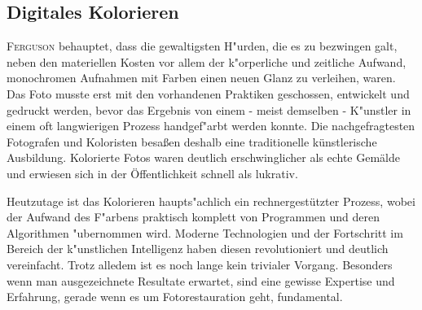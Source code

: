 \documentclass[12pt,titlepage]{article}
\begin{document}


\subsection{Digitales Kolorieren}

\textsc{Ferguson \cite{ferguson2008living}} behauptet, dass die gewaltigsten H"urden, die es zu bezwingen galt, neben den materiellen Kosten vor allem der k"orperliche und zeitliche Aufwand, monochromen Aufnahmen mit Farben einen neuen Glanz zu verleihen, waren. Das Foto musste erst mit den vorhandenen Praktiken geschossen, entwickelt und gedruckt werden, bevor das Ergebnis von einem - meist demselben - K"unstler in einem oft langwierigen Prozess handgef"arbt werden konnte. Die nachgefragtesten Fotografen und Koloristen besaßen deshalb eine traditionelle künstlerische Ausbildung. Kolorierte Fotos waren deutlich erschwinglicher als echte Gemälde und erwiesen sich in der Öffentlichkeit schnell als lukrativ. \textsc{\cite{ferguson2008living, hoppe2010spectroscopic}}

Heutzutage ist das Kolorieren haupts"achlich ein rechnergest\"utzter Prozess, wobei der Aufwand des F"arbens praktisch komplett von Programmen und deren Algorithmen "ubernommen wird. Moderne Technologien und der Fortschritt im Bereich der k"unstlichen Intelligenz haben diesen revolutioniert und deutlich vereinfacht. Trotz alledem ist es noch lange kein trivialer Vorgang. Besonders wenn man ausgezeichnete Resultate erwartet, sind eine gewisse Expertise und Erfahrung, gerade wenn es um Fotorestauration geht, fundamental.
\end{document}
